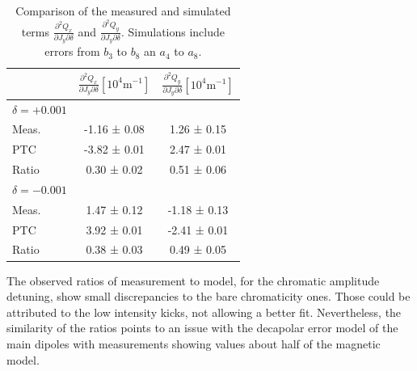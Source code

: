 \begin{table}[tbh]
    \centering
    \small
    \begin{tabular}{|l||c|c|}
    \hline
    & $\frac{\partial^2 Q_x}{\partial J_y \partial \delta}[10^{4}\mathrm{m}^{-1}]$ & $\frac{\partial^2 Q_y}{\partial J_y \partial \delta}[10^{4}\mathrm{m}^{-1}]$ \\
    \hline \hline
    $\delta = +0.001$ & & \\
    Meas.  &   -1.16 ± 0.08 &   1.26 ± 0.15 \\
    PTC    &   -3.82 ± 0.01 &   2.47 ± 0.01 \\
    Ratio  &    0.30 ± 0.02 &   0.51 ± 0.06 \\
    \hline
    $\delta = -0.001$ & & \\
    Meas.  &  1.47 ± 0.12  &  -1.18 ± 0.13 \\
    PTC    &  3.92 ± 0.01  &  -2.41 ± 0.01 \\
    Ratio  &  0.38 ± 0.03  &   0.49 ± 0.05 \\
    \hline
    \end{tabular}
    \caption{Comparison of the measured and simulated terms $\frac{\partial^2 Q_x}{\partial J_y \partial \delta}$ and $\frac{\partial^2 Q_y}{\partial J_y \partial \delta}$. Simulations include errors from $b_3$ to $b_8$ an $a_4$ to $a_8$.}
    \label{table:chromatic_ampdet}
\end{table}

The observed ratios of measurement to model, for the chromatic amplitude detuning, show small
discrepancies to the bare chromaticity ones. Those could be attributed to the low intensity kicks,
not allowing a better fit. Nevertheless, the similarity of the ratios points to an issue with the
decapolar error model of the main dipoles with measurements showing values about half of the
magnetic model.